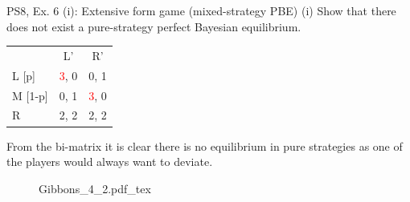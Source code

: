 \begin{frame}{PS8, Ex. 6 (i): Extensive form game (mixed-strategy PBE)}
    (i) Show that there does not exist a pure-strategy perfect Bayesian equilibrium.
    \begin{multicols}{2}
      \begin{table}
        \begin{tabular}{l|c|c|}
          \multicolumn{1}{c}{} & \multicolumn{1}{c}{L'} & \multicolumn{1}{c}{R'} \\\cline{2-3}
          L [p]   & \textcolor{red}{3}, 0 & 0, \color{blue}1 \\\cline{2-3}
          M [1-p] & 0, \color{blue}1 & \textcolor{red}{3}, 0 \\\cline{2-3}
          R       & 2, \color{blue}2 & 2, \color{blue}2 \\\cline{2-3}
        \end{tabular}
      \end{table} \vspace{-4pt}
      From the bi-matrix it is clear there is no equilibrium in pure strategies as one of the players would always want to deviate.
      \vfill\null\columnbreak
      \begin{figure}[!h]
        \center {}
        {Gibbons_4_2.pdf_tex}
      \end{figure}
      \vfill\null
    \end{multicols}
\end{frame}

